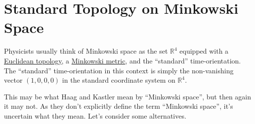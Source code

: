 \section{Standard Topology on Minkowski Space}\label{sctn:standard-topology-on-minkowski-space}
Physicists usually think of Minkowski space as the set $\mathbb{R}^4$ equipped with a \href{https://ncatlab.org/nlab/show/Euclidean+topology}{Euclidean topology}, a \href{https://ncatlab.org/nlab/show/Minkowski+metric}{Minkowski metric}, and the ``standard'' time-orientation. The ``standard'' time-orientation in this context is simply the non-vanishing vector $(1,0,0,0)$ in the standard coordinate system on $\mathbb{R}^4$.

This may be what Haag and Kastler mean by ``Minkowski space'', but then again it may not. As they don't explicitly define the term ``Minkowski space'', it's uncertain what they mean. Let's consider some alternatives.
